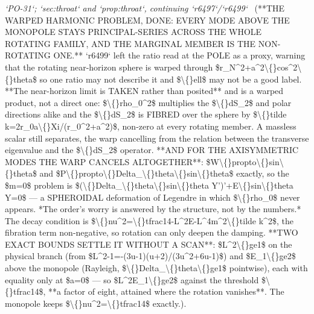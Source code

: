 \begin{description}
\textit{`PO-31`; `sec:throat` and `prop:throat`, continuing `r6497`/`r6499`} \ (**THE WARPED HARMONIC PROBLEM, DONE: EVERY MODE ABOVE THE MONOPOLE STAYS PRINCIPAL-SERIES ACROSS THE WHOLE ROTATING FAMILY, AND THE MARGINAL MEMBER IS THE NON-ROTATING ONE.** `r6499` left the ratio read at the POLE as a proxy, warning that the rotating near-horizon sphere is warped through \$r\_N\textasciicircum{}2+a\textasciicircum{}2\textbackslash\{\}cos\textasciicircum{}2\textbackslash\{\}theta\$ so one ratio may not describe it and \$\textbackslash\{\}ell\$ may not be a good label.  **The near-horizon limit is TAKEN rather than posited** and is a warped product, not a direct one: \$\textbackslash\{\}rho\_0\textasciicircum{}2\$ multiplies the \$\textbackslash\{\}dS\_2\$ and polar directions alike and the \$\textbackslash\{\}dS\_2\$ is FIBRED over the sphere by \$\textbackslash\{\}tilde k=2r\_0a\textbackslash\{\}Xi/(r\_0\textasciicircum{}2+a\textasciicircum{}2)\$, non-zero at every rotating member. A massless scalar still separates, the warp cancelling from the relation between the transverse eigenvalue and the \$\textbackslash\{\}dS\_2\$ operator.  **AND FOR THE AXISYMMETRIC MODES THE WARP CANCELS ALTOGETHER**: \$W\textbackslash\{\}propto\textbackslash\{\}sin\textbackslash\{\}theta\$ and \$P\textbackslash\{\}propto\textbackslash\{\}Delta\_\textbackslash\{\}theta\textbackslash\{\}sin\textbackslash\{\}theta\$ exactly, so the \$m=0\$ problem is \$(\textbackslash\{\}Delta\_\textbackslash\{\}theta\textbackslash\{\}sin\textbackslash\{\}theta Y')'+E\textbackslash\{\}sin\textbackslash\{\}theta Y=0\$ --- a SPHEROIDAL deformation of Legendre in which \$\textbackslash\{\}rho\_0\$ never appears. *The order's worry is answered by the structure, not by the numbers.* The decay condition is \$\textbackslash\{\}nu\textasciicircum{}2=\textbackslash\{\}tfrac14-L\textasciicircum{}2E-L\textasciicircum{}4m\textasciicircum{}2\textbackslash\{\}tilde k\textasciicircum{}2\$, the fibration term non-negative, so rotation can only deepen the damping. **TWO EXACT BOUNDS SETTLE IT WITHOUT A SCAN**: \$L\textasciicircum{}2\textbackslash\{\}ge1\$ on the physical branch (from \$L\textasciicircum{}2-1=-(3u-1)(u+2)/(3u\textasciicircum{}2+6u-1)\$) and \$E\_1\textbackslash\{\}ge2\$ above the monopole (Rayleigh, \$\textbackslash\{\}Delta\_\textbackslash\{\}theta\textbackslash\{\}ge1\$ pointwise), each with equality only at \$a=0\$ --- so \$L\textasciicircum{}2E\_1\textbackslash\{\}ge2\$ against the threshold \$\textbackslash\{\}tfrac14\$, **a factor of eight, attained where the rotation vanishes**. The monopole keeps \$\textbackslash\{\}nu\textasciicircum{}2=\textbackslash\{\}tfrac14\$ exactly.). 

\end{description}
